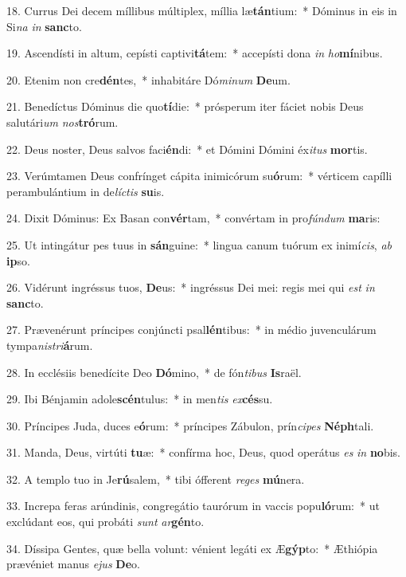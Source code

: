 18. Currus Dei decem míllibus múltiplex, míllia læ\textbf{tán}tium:~*  Dóminus in eis in Si\textit{na} \textit{in} \textbf{sanc}to.\

19. Ascendísti in altum, cepísti captivi\textbf{tá}tem:~*  accepísti dona \textit{in} \textit{ho}\textbf{mí}nibus.\

20. Etenim non cre\textbf{dén}tes,~*  inhabitáre Dó\textit{mi}\textit{num} \textbf{De}um.\

21. Benedíctus Dóminus die quo\textbf{tí}die:~*  prósperum iter fáciet nobis Deus salutári\textit{um} \textit{nos}\textbf{tró}rum.\

22. Deus noster, Deus salvos faci\textbf{én}di:~*  et Dómini Dómini éx\textit{i}\textit{tus} \textbf{mor}tis.\

23. Verúmtamen Deus confrínget cápita inimicórum su\textbf{ó}rum:~*  vérticem capílli perambulántium in de\textit{líc}\textit{tis} \textbf{su}is.\

24. Dixit Dóminus: Ex Basan con\textbf{vér}tam,~*  convértam in pro\textit{fún}\textit{dum} \textbf{ma}ris:\

25. Ut intingátur pes tuus in \textbf{sán}guine:~*  lingua canum tuórum ex inimí\textit{cis}, \textit{ab} \textbf{ip}so.\

26. Vidérunt ingréssus tuos, \textbf{De}us:~*  ingréssus Dei mei: regis mei qui \textit{est} \textit{in} \textbf{sanc}to.\

27. Prævenérunt príncipes conjúncti psal\textbf{lén}tibus:~*  in médio juvenculárum tympa\textit{nis}\textit{tri}\textbf{á}rum.\

28. In ecclésiis benedícite Deo \textbf{Dó}mino,~*  de fón\textit{ti}\textit{bus} \textbf{Is}raël.\

29. Ibi Bénjamin adole\textbf{scén}tulus:~*  in men\textit{tis} \textit{ex}\textbf{cés}su.\

30. Príncipes Juda, duces e\textbf{ó}rum:~*  príncipes Zábulon, prín\textit{ci}\textit{pes} \textbf{Néph}tali.\

31. Manda, Deus, virtúti \textbf{tu}æ:~*  confírma hoc, Deus, quod operátus \textit{es} \textit{in} \textbf{no}bis.\

32. A templo tuo in Je\textbf{rú}salem,~*  tibi ófferent \textit{re}\textit{ges} \textbf{mú}nera.\

33. Increpa feras arúndinis, congregátio taurórum in vaccis popu\textbf{ló}rum:~*  ut exclúdant eos, qui probáti \textit{sunt} \textit{ar}\textbf{gén}to.\

34. Díssipa Gentes, quæ bella volunt: vénient legáti ex Æ\textbf{gýp}to:~*  Æthiópia prævéniet manus \textit{e}\textit{jus} \textbf{De}o.\

